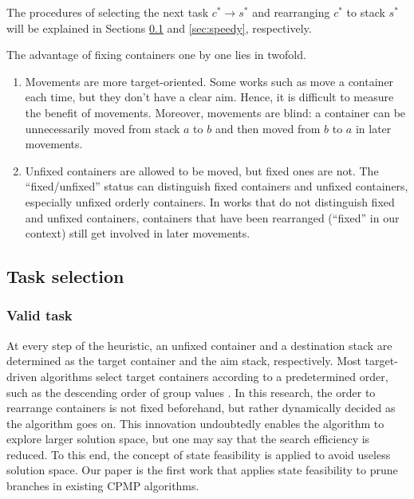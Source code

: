\documentclass[review,3p,times,12pt,number]{elsarticle}\usepackage{amsmath}\usepackage{amssymb}
\renewcommand{\citet}[1]{\citeauthor{#1} \citep{#1}}
\begin{document}
The procedures of selecting the next task $c^*\rightarrow s^*$ and rearranging $c^*$ to stack $s^*$ will be explained in Sections \ref{sec:task_sel} and \ref{sec:speedy}, respectively.

The advantage of fixing containers one by one lies in twofold.
\begin{enumerate}
\item Movements are more target-oriented. Some works such as \citet{bort2012} move a container each time, but they don't have a clear aim. Hence, it is difficult to measure the benefit of movements. Moreover, movements are blind: a container can be unnecessarily moved from stack $a$ to $b$ and then moved from $b$ to $a$ in later movements.
\item Unfixed containers are allowed to be moved, but fixed ones are not. The ``fixed/unfixed'' status can distinguish fixed containers and unfixed containers, especially unfixed orderly containers. In works that do not distinguish fixed and unfixed containers, containers that have been rearranged (``fixed'' in our context) still get involved in later movements.
\end{enumerate}

\subsection{Task selection}
\label{sec:task_sel}
\subsubsection{Valid task}
At every step of the heuristic, an unfixed container and a destination stack are determined as the target container and the aim stack, respectively.
Most target-driven algorithms select target containers according to a predetermined order, such as the descending order of group values \citep{exp2012}. In this research, the order to rearrange containers is not fixed beforehand, but rather dynamically decided as the algorithm goes on. This innovation undoubtedly enables the algorithm to explore larger solution space, but one may say that the search efficiency is reduced. To this end, the concept of state feasibility is applied to avoid useless solution space.
Our paper is the first work that applies state feasibility to prune branches in existing CPMP algorithms.
\end{document}
